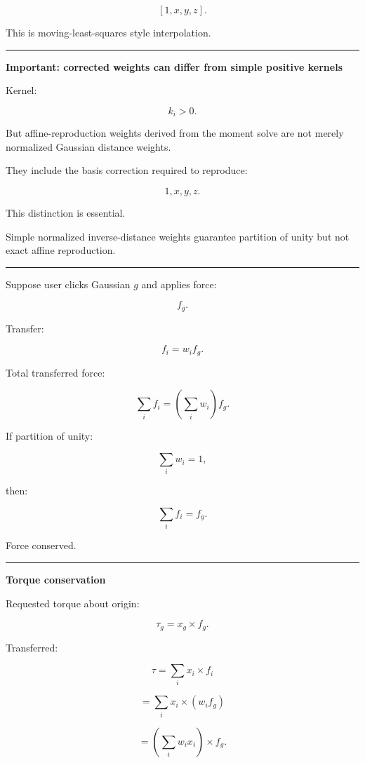 \[
[1,x,y,z].
\]

This is moving-least-squares style interpolation.

\begin{center}\rule{0.5\linewidth}{0.5pt}\end{center}

\textbf{Important: corrected weights can differ from simple positive kernels}

Kernel:

\[
k_i>0.
\]

But affine-reproduction weights derived from the moment solve are not merely normalized Gaussian distance weights.

They include the basis correction required to reproduce:

\[
1,x,y,z.
\]

This distinction is essential.

Simple normalized inverse-distance weights guarantee partition of unity but not exact affine reproduction.

\begin{center}\rule{0.5\linewidth}{0.5pt}\end{center}

Suppose user clicks Gaussian \(g\) and applies force:

\[
f_g.
\]

Transfer:

\[
\boxed{
f_i
=
w_i f_g.
}
\]

Total transferred force:

\[
\sum_i f_i
=
\left(
\sum_iw_i
\right)f_g.
\]

If partition of unity:

\[
\sum_iw_i=1,
\]

then:

\[
\boxed{
\sum_i f_i=f_g.
}
\]

Force conserved.

\begin{center}\rule{0.5\linewidth}{0.5pt}\end{center}

\textbf{Torque conservation}

Requested torque about origin:

\[
\tau_g=
x_g\times f_g.
\]

Transferred:

\[
\tau=
\sum_i
x_i\times f_i
\]

\[
=
\sum_i
x_i\times
(w_i f_g)
\]

\[
=
\left(
\sum_iw_ix_i
\right)
\times f_g.
\]

